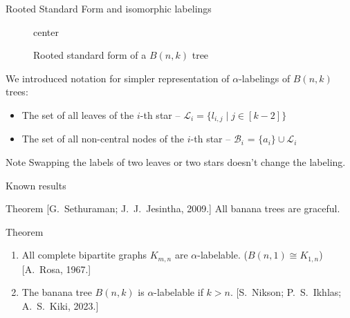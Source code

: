 \documentclass{beamer}
\begin{document}
\begin{frame}{Rooted Standard Form and isomorphic labelings}
\begin{figure}[H]
\begin{adjustbox}{center}
    \end{adjustbox}

    \caption{Rooted standard form of a $B(n, k)$ tree}
    \label{fig:rsf-banana-tree}
  \end{figure}
  \vspace{-0.5em}
  We introduced notation for simpler representation of $\alpha$-labelings of $B(n, k)$ trees:
  \begin{itemize}
    \item The set of all leaves of the $i$-th star -- $\mathcal{L}_i = \{l_{i,j} \mid j \in [k-2] \}$
    \item The set of all non-central nodes of the $i$-th star -- $\mathcal{B}_i$ = $\{a_i\} \cup \mathcal{L}_i$
  \end{itemize}
  \begin{block}{Note}
    Swapping the labels of two leaves or two stars doesn't change the labeling.
  \end{block}
\end{frame}

\begin{frame}{Known results}
  \begin{block}{Theorem [G.~Sethuraman; J.~J.~Jesintha, 2009.]}
    All banana trees are graceful.
  \end{block}
  \begin{block}{Theorem}
    \begin{enumerate}
      \item All complete bipartite graphs $K_{m,n}$ are $\alpha$-labelable. ($B(n,1) \cong K_{1,n}$) [A.~Rosa, 1967.]
      \item The banana tree $B(n, k)$ is $\alpha$-labelable if $k > n$. [S.~Nikson; P.~S.~Ikhlas; A.~S.~Kiki, 2023.]
    \end{enumerate}
  \end{block}
\end{frame}
\end{document}
